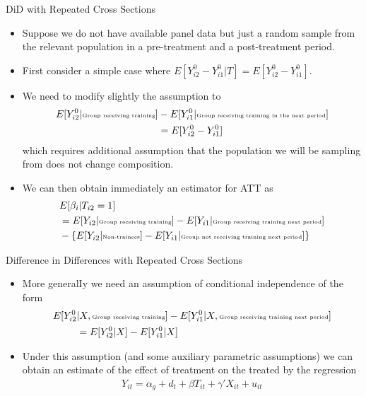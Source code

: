 \begin{frame}{DiD with Repeated Cross Sections}
\begin{itemize}
\item Suppose we do not have available panel data but just a random sample from the relevant population in a pre-treatment and a post-treatment period.
\item First consider a simple case where {\small $E[Y_{i2}^0- Y_{i1}^0 | T] = E[Y_{i2}^0- Y_{i1}^0]$}.
\item We need to modify slightly the assumption to
\vspace{-.5pc}
\begin{align*}
E[Y_{i2}^0| \text{\tiny Group receiving training}]&-E[Y_{i1}^0| \text{\tiny Group receiving training in the next period}] \\
&= E[Y_{i2}^0-Y_{i1}^0]  
\end{align*}
which requires additional assumption that the population we will be sampling from does not change composition.
\item We can then obtain immediately an estimator for ATT as
\begin{align*}
&E[\beta_i |T_{i2}=1] \\ 
&= E[Y_{i2}| \text{\tiny Group receiving training}]-E[Y_{i1}| \text{\tiny Group receiving training next period}] \\
&- \{E[Y_{i2} | \text{\tiny Non-trainees}] - E[Y_{i1} | \text{\tiny Group not receiving training next period}]\}
\end{align*}
\end{itemize}
\end{frame}


\begin{frame}{Difference in Differences with Repeated Cross Sections}
\begin{itemize}
\item More generalIy we need an assumption of conditional independence of the form
\begin{align*}
E[Y_{i2}^0 & | X, \text{\tiny Group receiving training}]-E[Y_{i1}^0| X, \text{\tiny Group receiving training next period}] \\
&= E[Y_{i2}^0 | X] - E[Y_{i1}^0 |X]
\end{align*}
\item Under this assumption (and some auxiliary parametric assumptions) we can obtain an estimate of the effect of treatment on the treated by the regression
\begin{align*}
Y_{it} = \alpha_g + d_t + \beta T_{it} + \gamma' X_{it} + u_{it}
\end{align*} 
\end{itemize}
\end{frame}

